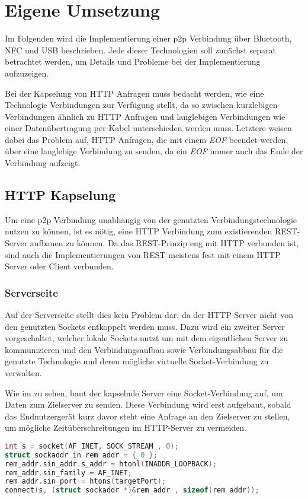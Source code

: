 \section{Eigene Umsetzung}
        Im Folgenden wird die Implementierung einer p2p Verbindung über Bluetooth, NFC und USB beschrieben. Jede dieser Technologien soll zunächst separat betrachtet werden, um Details und Probleme bei der Implementierung aufzuzeigen.
        
        Bei der Kapselung von HTTP Anfragen muss bedacht werden, wie eine Technologie Verbindungen zur Verfügung stellt, da so zwischen kurzlebigen Verbindungen ähnlich zu HTTP Anfragen und langlebigen Verbindungen wie einer Datenübertragung per Kabel unterschieden werden muss. Letztere weisen dabei das Problem auf, HTTP Anfragen, die mit einem {\it EOF} beendet werden, über eine langlebige Verbindung zu senden, da ein {\it EOF} immer auch das Ende der Verbindung aufzeigt.
        
    \subsection{HTTP Kapselung}
        Um eine p2p Verbindung unabhängig von der genutzten Verbindungstechnologie nutzen zu können, ist es nötig, eine HTTP Verbindung zum existierenden REST-Server aufbauen zu können. Da das REST-Prinzip eng mit HTTP verbunden ist, sind auch die Implementierungen von REST meistens fest mit einem HTTP Server oder Client verbunden.
    \subsubsection{Serverseite}        
        Auf der Serverseite stellt dies kein Problem dar, da der HTTP-Server nicht von den genutzten Sockets entkoppelt werden muss. Dazu wird ein zweiter Server vorgeschaltet, welcher lokale Sockets nutzt um mit dem eigentlichen Server zu kommunizieren und den Verbindungsaufbau sowie Verbindungsabbau für die genutzte Technologie und deren mögliche virtuelle Socket-Verbindung zu verwalten.
        
        Wie im  zu sehen, baut der kapselnde Server eine Socket-Verbindung auf, um Daten zum Zielserver zu senden. Diese Verbindung wird erst aufgebaut, sobald das Endnutzergerät kurz davor steht eine Anfrage an den Zielserver zu stellen, um mögliche Zeitüberschreitungen im HTTP-Server zu vermeiden.

        \begin{lstlisting}[frame=bt, label={lst:socket:create}, language=C, caption=Instanziierung eines Sockets (Servercode in C)]
int s = socket(AF_INET, SOCK_STREAM , 0);
struct sockaddr_in rem_addr = { 0 };
rem_addr.sin_addr.s_addr = htonl(INADDR_LOOPBACK);
rem_addr.sin_family = AF_INET;
rem_addr.sin_port = htons(targetPort);
connect(s, (struct sockaddr *)&rem_addr , sizeof(rem_addr));
        \end{lstlisting}        
        
